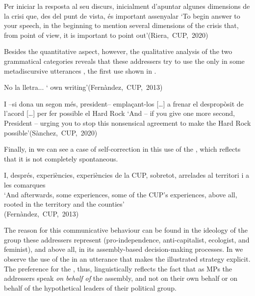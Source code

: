 \documentclass[output=paper]{langscibook}
\begin{document}
 \ex\label{ex:nogue:11b}
{Per iniciar la}  {resposta al seu discurs, inicialment}  {d’apuntar algunes dimensions de la crisi que, des del}  {punt de vista, és important assenyalar}
\glt `To begin  answer to your speech, in the beginning    to mention several dimensions of the crisis that, from  point of view, it is important to point out'\hfill\hbox{(Riera, CUP, 2020)}
\z 
\z

Besides the quantitative aspect, however, the qualitative analysis of the two grammatical categories reveals that these addressers try to use the  only in some metadiscursive utterances , the first use shown in .

\ea\label{ex:nogue:12}
 \ea\label{ex:nogue:12a}
{No}  {la}  {lletra...}
\glt `    own writing'\hfill\hbox{(Fernàndez, CUP, 2013)}\\

 \ex\label{ex:nogue:12b}

{I}  {–si}  {dona un segon més, president– emplaçant-los} […] {a frenar el despropòsit de l’acord} […] {per fer possible el Hard Rock}
\glt `And   – if you give  one more second, President – urging you to stop this nonsensical agreement to make the Hard Rock possible'\hfill\hbox{(Sànchez, CUP, 2020)}\\
\z 
\z 

Finally, in  we can see a case of self-correction in this use of the , which reflects that it is not completely spontaneous.

\ea\label{ex:nogue:13}
{{I, després,}  {experiències,}  {experiències de la CUP, sobretot, arrelades al territori i a les comarques}}\\


\glt `And afterwards,   some experiences,   some of the CUP’s experiences, above all, rooted in the territory and the counties'\\
\hfill\hbox{(Fernàndez, CUP, 2013)}\\
\z 


The reason for this communicative behaviour can be found in the ideology of the group these addressers represent (pro-independence, anti-capitalist, ecologist, and feminist), and above all, in its assembly-based decision-making processes. In  we observe the use of the  in an utterance that makes the illustrated strategy explicit. The preference for the , thus, linguistically reflects the fact that as MPs the addressers speak \textit{on behalf of} the assembly, and not on their own behalf or on behalf of the hypothetical leaders of their political group.
\end{document}

